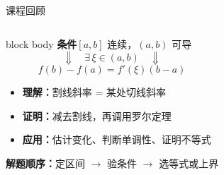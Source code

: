 \documentclass[aspectratio=169,11pt]{beamer}
\begin{document}
\begin{frame}{课程回顾}
  \begin{columns}[c,onlytextwidth]
      \begin{beamercolorbox}[rounded=true,sep=3.2mm,wd=\linewidth]{block body}
        \textbf{条件}\quad $[a,b]$ 连续，$(a,b)$ 可导
        \[
          \Downarrow\quad \exists\,\xi\in(a,b)\quad\Downarrow
        \]
        \[
          \boxed{f(b)-f(a)=f'(\xi)(b-a)}
        \]
        \vspace{0mm}
        \begin{itemize}
          \item \textbf{理解：}割线斜率 = 某处切线斜率
          \item \textbf{证明：}减去割线，再调用罗尔定理
          \item \textbf{应用：}估计变化、判断单调性、证明不等式
        \end{itemize}
        \vspace{0mm}
        \textcolor{LessonAccent}{\textbf{解题顺序：}定区间 $\rightarrow$ 验条件 $\rightarrow$ 选等式或上界}
      \end{beamercolorbox}
      \mbox{}
  \end{columns}
\end{frame}
\LessonClearBackground
\end{document}
